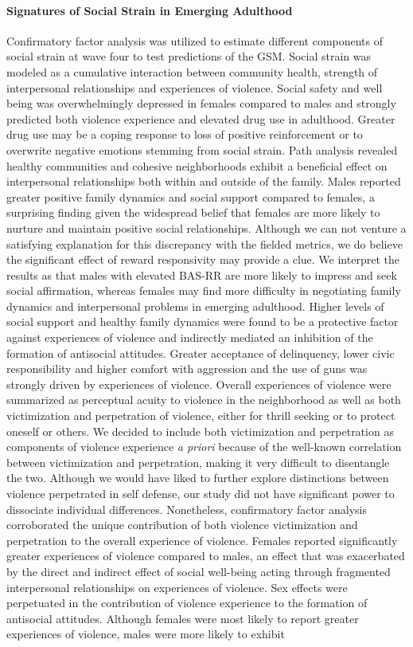 \documentclass[utf8]{article}
\begin{document}
\paragraph{Signatures of Social Strain in Emerging Adulthood} Confirmatory factor analysis was utilized to estimate different components of social strain at wave four to test predictions of the GSM. Social strain was modeled as a cumulative interaction between community health, strength of interpersonal relationships and experiences of violence. Social safety and well being was overwhelmingly depressed in females compared to males and strongly predicted both violence experience and elevated drug use in adulthood. Greater drug use may be a coping response to loss of positive reinforcement or to overwrite negative emotions stemming from social strain. Path analysis revealed healthy communities and cohesive neighborhoods exhibit a beneficial effect on interpersonal relationships both within and outside of the family. Males reported greater positive family dynamics and social support compared to females, a surprising finding given the widespread belief that females are more likely to nurture and maintain positive social relationships. Although we can not venture a satisfying explanation for this discrepancy with the fielded metrics, we do believe the significant effect of reward responsivity may provide a clue. We interpret the results as that males with elevated BAS-RR are more likely to impress and seek social affirmation, whereas females may find more difficulty in negotiating family dynamics and interpersonal problems in emerging adulthood. Higher levels of social support and healthy family dynamics were found to be a protective factor against experiences of violence and indirectly mediated an inhibition of the formation of antisocial attitudes. Greater acceptance of delinquency, lower civic responsibility and higher comfort with aggression and the use of guns was strongly driven by experiences of violence. Overall experiences of violence were summarized as perceptual acuity to violence in the neighborhood as well as both victimization and perpetration of violence, either for thrill seeking or to protect oneself or others. We decided to include both victimization and perpetration as components of violence experience \textit{a priori} because of the well-known correlation between victimization and perpetration, making it very difficult to disentangle the two. Although we would have liked to further explore distinctions between violence perpetrated in self defense, our study did not have significant power to dissociate individual differences. Nonetheless, confirmatory factor analysis corroborated the unique contribution of both violence victimization and perpetration to the overall experience of violence. Females reported significantly greater experiences of violence compared to males, an effect that was exacerbated by the direct and indirect effect of social well-being acting through fragmented interpersonal relationships on experiences of violence. Sex effects were perpetuated in the contribution of violence experience to the formation of antisocial attitudes. Although females were most likely to report greater experiences of violence, males were more likely to exhibit 
\end{document}
